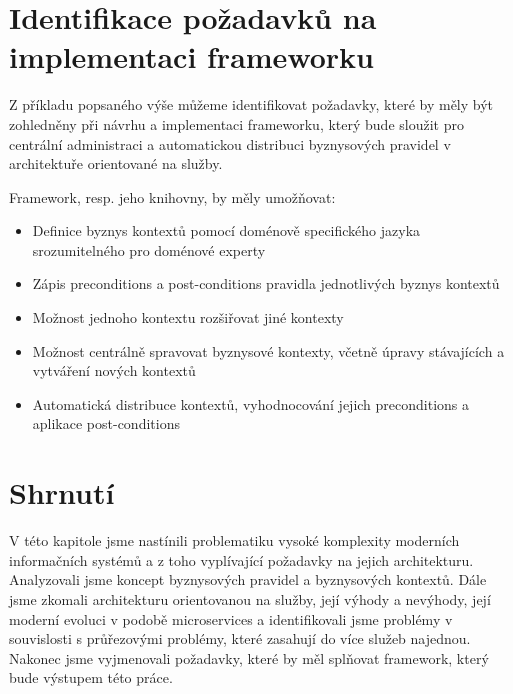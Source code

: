 \section{Identifikace požadavků na implementaci frameworku}

Z příkladu popsaného výše můžeme identifikovat požadavky, které by měly
být zohledněny při návrhu a implementaci frameworku, který bude sloužit
pro centrální administraci a automatickou distribuci byznysových pravidel
v architektuře orientované na služby.

Framework, resp. jeho knihovny, by měly umožňovat:

\begin{itemize}
    \item{Definice byznys kontextů pomocí doménově specifického jazyka srozumitelného pro doménové experty}
    \item{Zápis preconditions a post-conditions pravidla jednotlivých byznys kontextů}
    \item{Možnost jednoho kontextu rozšiřovat jiné kontexty}
    \item{Možnost centrálně spravovat byznysové kontexty, včetně úpravy stávajících a vytváření nových kontextů}
    \item{Automatická distribuce kontextů, vyhodnocování jejich preconditions a aplikace post-conditions}
\end{itemize}

\section{Shrnutí}

V této kapitole jsme nastínili problematiku vysoké komplexity moderních informačních systémů
a z toho vyplívající požadavky na jejich architekturu. Analyzovali jsme koncept byznysových
pravidel a byznysových kontextů. Dále jsme zkomali architekturu orientovanou na služby, její
výhody a nevýhody, její moderní evoluci v podobě microservices a identifikovali jsme problémy
v souvislosti s průřezovými problémy, které zasahují do více služeb najednou. Nakonec jsme
vyjmenovali požadavky, které by měl splňovat framework, který bude výstupem této práce.
